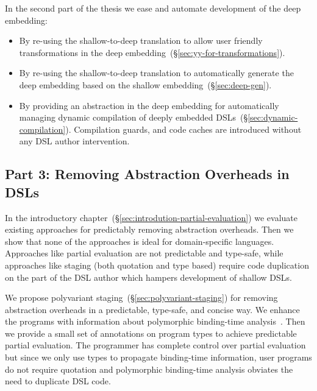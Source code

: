  In the second part of the thesis we ease and automate development of the deep embedding: \begin{itemize}

   \item By re-using the shallow-to-deep translation to allow user friendly
    transformations in the deep embedding~(\S \ref{sec:yy-for-transformations}).

   \item By re-using the shallow-to-deep translation to automatically generate the deep embedding based on the
    shallow embedding~(\S \ref{sec:deep-gen}).

   \item By providing an abstraction in the deep embedding for automatically managing
     dynamic compilation of deeply embedded DSLs~(\S \ref{sec:dynamic-compilation}). Compilation
     guards, and code caches are introduced without any DSL author intervention.

 \end{itemize}

\subsection{Part 3: Removing Abstraction Overheads in DSLs}
\label{sec:removing-abstraction-overheads}

 In the introductory chapter~(\S \ref{sec:introdution-partial-evaluation}) we evaluate
  existing approaches for predictably removing abstraction overheads. Then we show that none of
  the approaches is ideal for domain-specific languages. Approaches like partial evaluation
  are not predictable and type-safe, while approaches like staging (both quotation and type based)
  require code duplication on the part of the DSL author which hampers development of shallow DSLs.

We propose polyvariant staging~(\S \ref{sec:polyvariant-staging}) for removing abstraction
 overheads in a predictable, type-safe, and concise way. We enhance the programs with
 information about polymorphic binding-time analysis~\cite{rytz1992polyvariant}. Then we provide
 a small set of annotations on program types to achieve predictable partial evaluation.
 The programmer has complete control over partial evaluation but since we only use types to propagate binding-time information, user programs do not require quotation and polymorphic binding-time analysis obviates the need to duplicate DSL code.

